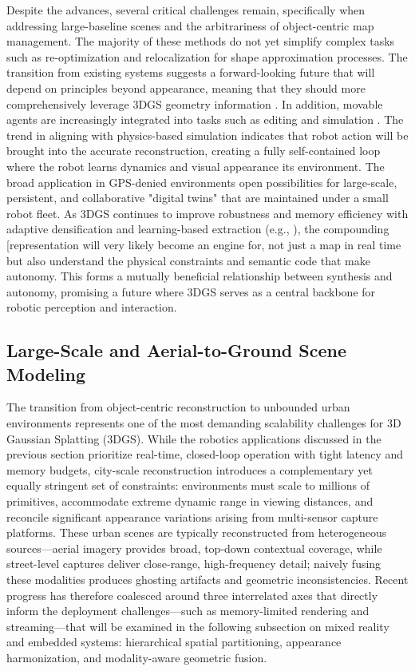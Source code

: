 \documentclass[11pt,a4paper]{article}
\begin{document}
Despite the advances, several critical challenges remain, specifically when addressing large-baseline scenes and the arbitrariness of object-centric map management. The majority of these methods do not yet simplify complex tasks such as re-optimization and relocalization for shape approximation processes. The transition from existing systems suggests a forward-looking future that will depend on principles beyond appearance, meaning that they should more comprehensively leverage 3DGS geometry information \cite{arxiv:2509.13938v1}. In addition, movable agents are increasingly integrated into tasks such as editing and simulation \cite{arxiv:2401.03890v2,arxiv:2505.13215v1}. The trend in aligning with physics-based simulation \cite{arxiv:2509.13938v1} indicates that robot action will be brought into the accurate reconstruction, creating a fully self-contained loop where the robot learns dynamics and visual appearance its environment. The broad application in GPS-denied environments open possibilities for large-scale, persistent, and collaborative "digital twins" that are maintained under a small robot fleet. As 3DGS continues to improve robustness and memory efficiency with adaptive densification and learning-based extraction (e.g., \cite{arxiv:2409.11307v1,arxiv:2403.14166v1}), the compounding [representation will very likely become an engine for, not just a map in real time but also understand the physical constraints and semantic code that make autonomy. This forms a mutually beneficial relationship between synthesis and autonomy, promising a future where 3DGS serves as a central backbone for robotic perception and interaction.


\subsection{Large-Scale and Aerial-to-Ground Scene Modeling}


The transition from object-centric reconstruction to unbounded urban environments represents one of the most demanding scalability challenges for 3D Gaussian Splatting (3DGS). While the robotics applications discussed in the previous section prioritize real-time, closed-loop operation with tight latency and memory budgets, city-scale reconstruction introduces a complementary yet equally stringent set of constraints: environments must scale to millions of primitives, accommodate extreme dynamic range in viewing distances, and reconcile significant appearance variations arising from multi-sensor capture platforms. These urban scenes are typically reconstructed from heterogeneous sources---aerial imagery provides broad, top-down contextual coverage, while street-level captures deliver close-range, high-frequency detail; naively fusing these modalities produces ghosting artifacts and geometric inconsistencies. Recent progress has therefore coalesced around three interrelated axes that directly inform the deployment challenges---such as memory-limited rendering and streaming---that will be examined in the following subsection on mixed reality and embedded systems: hierarchical spatial partitioning, appearance harmonization, and modality-aware geometric fusion.
\end{document}
